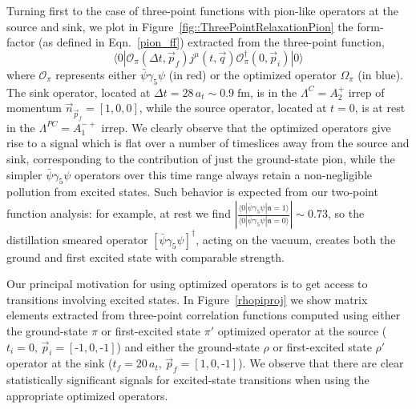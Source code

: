 \documentclass[twocolumn,amsmath,amssymb,prd,10pt,floatfix, 
superscriptaddress,nofootinbib, showpacs, preprintnumbers]{revtex4-1}
\begin{document}
Turning first to the case of three-point functions with pion-like operators at the source and sink, we plot in Figure~\ref{fig::ThreePointRelaxationPion} the form-factor (as defined in Eqn.~\ref{pion_ff}) extracted from the three-point function, 
\begin{equation*}
\langle 0 | \mathcal{O}_\pi(\Delta t,\vec{p}_f) j^\mu(t, \vec{q}) \mathcal{O}^\dagger_\pi(0,\vec{p}_i) | 0 \rangle
\end{equation*}
where $\mathcal{O}_\pi$ represents either $\bar{\psi}\gamma_5\psi$ (in red) or the optimized operator $\Omega_\pi$ (in blue). The sink operator, located at $\Delta t = 28\, a_t \sim 0.9 \;\mathrm{fm}$, is in the $\Lambda^C = A_2^+$ irrep of momentum $\vec{n}_{\vec{p}_f} = [1,0,0]$, while the source operator, located at $t = 0$, is at rest in the $\Lambda^{PC} = A_1^{-+}$ irrep. We clearly observe that the optimized operators give rise to a signal which is flat over a number of timeslices away from the source and sink, corresponding to the contribution of just the ground-state pion, while the simpler $\bar{\psi}\gamma_5\psi$ operators over this time range always retain a non-negligible pollution from excited states. Such behavior is expected from our two-point function analysis: for example, at rest we find $\left| \tfrac{ \langle 0 | \bar{\psi}\gamma_5 \psi | \mathfrak{n} = 1\rangle}{  \langle 0 | \bar{\psi}\gamma_5 \psi | \mathfrak{n} = 0\rangle} \right| \sim 0.73$, so the distillation smeared operator $\left[ \bar{\psi} \gamma_5 \psi \right]^\dagger $, acting on the vacuum, creates both the ground and first excited state with comparable strength.

Our principal motivation for using optimized operators is to get access to transitions involving excited states. In Figure~\ref{rhopiproj} we show matrix elements extracted from three-point correlation functions computed using either the ground-state $\pi$ or first-excited state $\pi'$ optimized operator at the source ($t_i=0,\, \vec{p}_i=[\text{-}1, 0, \text{-}1]$) and either the ground-state $\rho$ or first-excited state $\rho'$ operator at the sink ($t_f = 20\,a_t,\, \vec{p}_f=[1, 0, \text{-}1]$). We observe that there are clear statistically significant signals for excited-state transitions when using the appropriate optimized operators.
\end{document}
